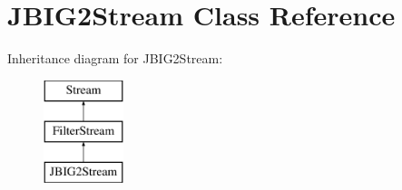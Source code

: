 \hypertarget{class_j_b_i_g2_stream}{}\section{J\+B\+I\+G2\+Stream Class Reference}
\label{class_j_b_i_g2_stream}
Inheritance diagram for J\+B\+I\+G2\+Stream\+:\begin{figure}[H]
\begin{center}
\leavevmode
\includegraphics[height=3.000000cm]{class_j_b_i_g2_stream}
\end{center}
\end{figure}
